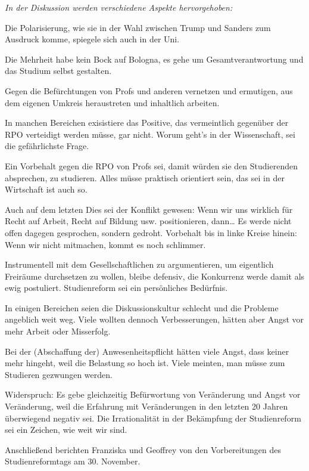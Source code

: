 \documentclass[ngerman,headheight=70pt]{scrartcl}
\begin{document}
    \textit{In der Diskussion werden verschiedene Aspekte hervorgehoben:}

    Die Polarisierung, wie sie in der Wahl zwischen Trump und Sanders zum
    Ausdruck komme, spiegele sich auch in der Uni.

    Die Mehrheit habe kein Bock auf Bologna, es gehe um Gesamtverantwortung und
    das Studium selbst gestalten.

    Gegen die Befürchtungen von Profs und anderen vernetzen und ermutigen, aus
    dem eigenen Umkreis heraustreten und inhaltlich arbeiten.

    In manchen Bereichen exisistiere das Positive, das vermeintlich gegenüber der
    RPO verteidigt werden müsse, gar nicht. Worum geht’s in der Wissenschaft,
    sei die gefährlichste Frage.

    Ein Vorbehalt gegen die RPO von Profs sei, damit würden sie den Studierenden
    absprechen, zu studieren. Alles müsse praktisch orientiert sein, das sei in
    der Wirtschaft ist auch so.

    Auch auf dem letzten Dies sei der Konflikt gewesen: Wenn wir uns wirklich für
    Recht auf Arbeit, Recht auf Bildung usw. positionieren, dann… Es werde nicht
    offen dagegen gesprochen, sondern gedroht. Vorbehalt bis in linke Kreise
    hinein: Wenn wir nicht mitmachen, kommt es noch schlimmer.

    Instrumentell mit dem Gesellschaftlichen zu argumentieren, um eigentlich
    Freiräume durchsetzen zu wollen, bleibe defensiv, die Konkurrenz werde damit
    als ewig postuliert. Studienreform sei ein persönliches Bedürfnis.

    In einigen Bereichen seien die Diskussionskultur schlecht und die Probleme
    angeblich weit weg. Viele wollten dennoch Verbesserungen, hätten aber Angst
    vor mehr Arbeit oder Misserfolg.

    Bei der (Abschaffung der) Anwesenheitspflicht hätten viele Angst, dass keiner
    mehr hingeht, weil die Belastung so hoch ist. Viele meinten, man müsse zum
    Studieren gezwungen werden.

    Widerspruch: Es gebe gleichzeitig Befürwortung von Veränderung und Angst vor
    Veränderung, weil die Erfahrung mit Veränderungen in den letzten 20 Jahren
    überwiegend negativ sei. Die Irrationalität in der Bekämpfung der
    Studienreform sei ein Zeichen, wie weit wir sind.

    Anschließend berichten Franziska und Geoffrey von den Vorbereitungen des
    Studienreformtags am 30. November.
\end{document}
